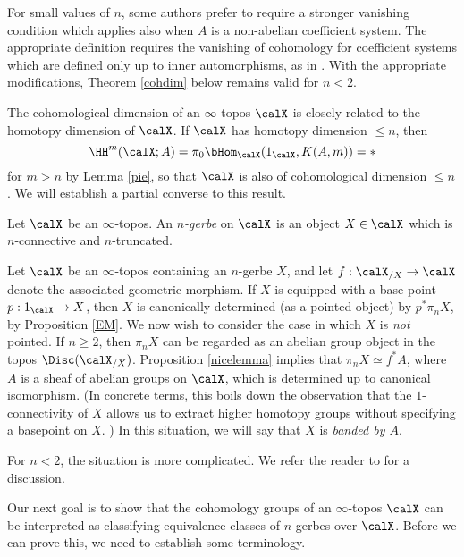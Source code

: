 \begin{remark}
For small values of $n$, some authors prefer to require a stronger
vanishing condition which applies also when $A$ is a non-abelian
coefficient system. The appropriate definition requires the
vanishing of cohomology for coefficient systems which are defined
only up to inner automorphisms, as in \cite{giraud}. With the
appropriate modifications, Theorem \ref{cohdim} below remains
valid for $n < 2$.
\end{remark}

The cohomological dimension of an $\infty$-topos $\calX$ is closely related to the homotopy dimension of $\calX$. If $\calX$ has homotopy dimension $\leq n$, then
$$ \HH^m (\calX; A)  = \pi_0 \bHom_{\calX}(1_{\calX}, K(A,m)) = \ast $$
for $m > n$ by Lemma \ref{pie}, so that $\calX$ is also of cohomological dimension
$\leq n$. We will establish a partial converse to this result. 

\begin{definition}
Let $\calX$ be an $\infty$-topos. An {\it $n$-gerbe} on $\calX$ is an object
$X \in \calX$ which is $n$-connective and $n$-truncated.
\end{definition}

Let $\calX$ be an $\infty$-topos containing an $n$-gerbe $X$, and let $f: \calX_{/X} \rightarrow \calX$ denote the associated geometric morphism. If $X$ is equipped with a base point $p: 1_{\calX} \rightarrow X$, then $X$
is canonically determined (as a pointed object) by $p^{\ast} \pi_n X$, by Proposition \ref{EM}.
We now wish to consider the case in which $X$ is {\em not} pointed. If $n \geq 2$, 
then $\pi_n X$ can be regarded as an abelian group object in the topos
$\Disc(\calX_{/X})$. 
Proposition \ref{nicelemma} implies that $\pi_n X \simeq f^{\ast} A$, where $A$ is a sheaf
of abelian groups on $\calX$, which is determined up to canonical isomorphism.
(In concrete terms, this boils down the observation that the $1$-connectivity of $X$ allows us
to extract higher homotopy groups without specifying a basepoint on $X$. )
In this situation, we will say that $X$ is {\it banded by $A$}.

\begin{remark}
For $n < 2$, the situation is more complicated. We refer the reader to \cite{giraud} for a discussion.
\end{remark}

Our next goal is to show that the cohomology groups of an $\infty$-topos $\calX$ can be interpreted as classifying equivalence classes of $n$-gerbes over $\calX$. Before we can prove this, we need to establish some terminology.

